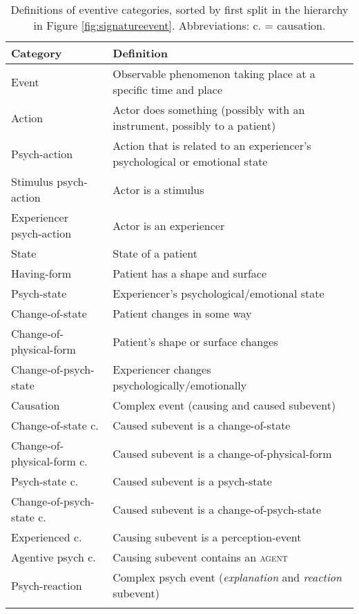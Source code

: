\begin{table}
    \caption[Definitions of eventive categories]{\label{tab:eventive-defs}Definitions of eventive categories, sorted by first split in the hierarchy in Figure \ref{fig:signatureevent}. Abbreviations: c. = causation.}
    \begin{tabularx}{\textwidth}{lQ}
      \lsptoprule
      Category & Definition \\
      \midrule
      Event & Observable phenomenon taking place at a specific time and place
      \\
      Action & Actor does something (possibly with an instrument, possibly to a patient) \\ 
      Psych-action & Action that is related to an experiencer's psychological or emotional state \\ 
      Stimulus psych-action & Actor is a stimulus \\ 
      Experiencer psych-action & Actor is an experiencer \\ 
      State & State of a patient \\
      Having-form & Patient has a shape and surface \\
      Psych-state & Experiencer's psychological/emotional state \\
      Change-of-state & Patient changes in some way  \\ 
      Change-of-physical-form & Patient's shape or surface changes \\ 
      Change-of-psych-state & Experiencer changes psychologically/emotionally  \\ 
     Causation & Complex event (causing and caused subevent) \\ 
     Change-of-state c. & Caused subevent is a change-of-state \\ 
     Change-of-physical-form c. & Caused subevent is a change-of-physical-form \\ 
     Psych-state c. & Caused subevent is a psych-state \\
     Change-of-psych-state c. & Caused subevent is a change-of-psych-state \\
     Experienced c. & Causing subevent is a perception-event \\
     Agentive psych c. & Causing subevent contains an \textsc{agent} \\
      Psych-reaction & Complex psych event (\textit{explanation} and \textit{reaction} subevent) \\
     \lspbottomrule 
    \end{tabularx}
\end{table}

